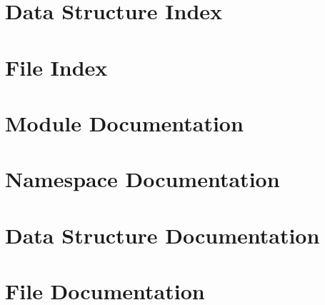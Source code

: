 \documentclass{book}
\begin{document}
\chapter{Data Structure Index}

\chapter{File Index}

\chapter{Module Documentation}


\chapter{Namespace Documentation}


\chapter{Data Structure Documentation}



\chapter{File Documentation}




























\printindex
\end{document}
